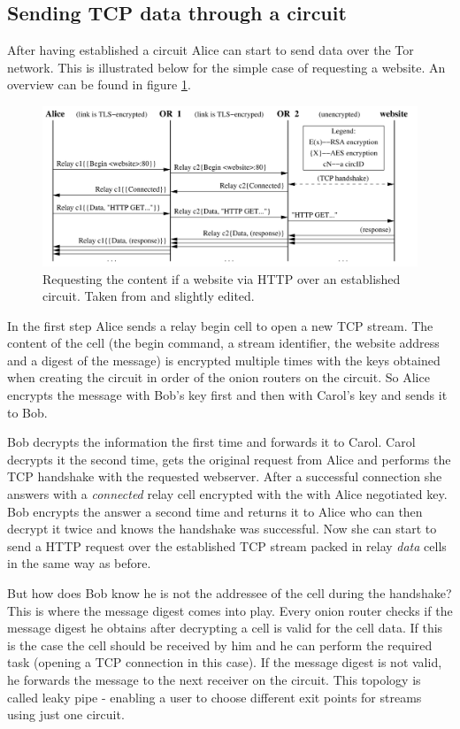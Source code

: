 \subsection{Sending TCP data through a circuit}

After having established a circuit Alice can start to send data over the Tor network. This is illustrated below for the simple case of requesting a website. An overview can be found in figure \ref{img_http_request}.

\begin{figure}
	\includegraphics[width=\columnwidth]{img/http_request.png}
	\caption{Requesting the content if a website via HTTP over an established circuit. Taken from \cite{tor2004original} and slightly edited.}
	\label{img_http_request}
\end{figure}

In the first step Alice sends a relay begin cell to open a new TCP stream. The content of the cell (the begin command, a stream identifier, the website address and a digest of the message) is encrypted multiple times with the keys obtained when creating the circuit in order of the onion routers on the circuit. So Alice encrypts the message with Bob's key first and then with Carol's key and sends it to Bob.

Bob decrypts the information the first time and forwards it to Carol. Carol decrypts it the second time, gets the original request from Alice and performs the TCP handshake with the requested webserver. After a successful connection she answers with a \textit{connected} relay cell encrypted with the with Alice negotiated key. Bob encrypts the answer a second time and returns it to Alice who can then decrypt it twice and knows the handshake was successful. Now she can start to send a HTTP request over the established TCP stream packed in relay \textit{data} cells in the same way as before.

But how does Bob know he is not the addressee of the cell during the handshake? This is where the message digest comes into play. Every onion router checks if the message digest he obtains after decrypting a cell is valid for the cell data. If this is the case the cell should be received by him and he can perform the required task (opening a TCP connection in this case). If the message digest is not valid, he forwards the message to the next receiver on the circuit. This topology is called leaky pipe - enabling a user to choose different exit points for streams using just one circuit. 

